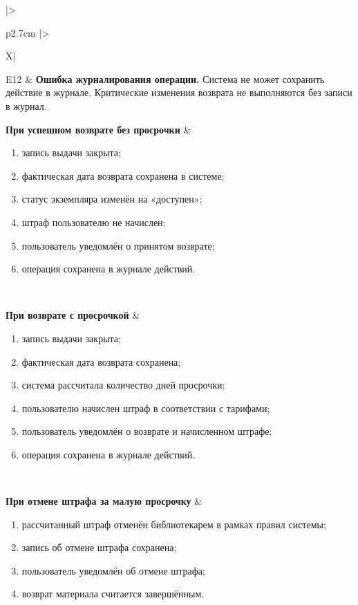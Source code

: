 \documentclass[12pt,a4paper]{article}
\begin{document}
\begin{xltabular}{\textwidth}{
				|>{\raggedright\arraybackslash}p{2.7cm}
				|>{\raggedright\arraybackslash}X|
			}
			E12 &
			\textbf{Ошибка журналирования операции.}
			Система не может сохранить действие в журнале. Критические изменения
			возврата не выполняются без записи в журнал. \\
			\hline
			
			
			\textbf{При успешном возврате без просрочки} &
			\begin{enumerate}
				\item запись выдачи закрыта;
				\item фактическая дата возврата сохранена в системе;
				\item статус экземпляра изменён на «доступен»;
				\item штраф пользователю не начислен;
				\item пользователь уведомлён о принятом возврате;
				\item операция сохранена в журнале действий.
			\end{enumerate} \\
			\hline
			
			\textbf{При возврате с просрочкой} &
			\begin{enumerate}
				\item запись выдачи закрыта;
				\item фактическая дата возврата сохранена;
				\item система рассчитала количество дней просрочки;
				\item пользователю начислен штраф в соответствии с тарифами;
				\item пользователь уведомлён о возврате и начисленном штрафе;
				\item операция сохранена в журнале действий.
			\end{enumerate} \\
			\hline
			
			\textbf{При отмене штрафа за малую просрочку} &
			\begin{enumerate}
				\item рассчитанный штраф отменён библиотекарем в рамках правил
				системы;
				\item запись об отмене штрафа сохранена;
				\item пользователь уведомлён об отмене штрафа;
				\item возврат материала считается завершённым.
			\end{enumerate} \\
			\hline
			

\end{xltabular}
\end{document}
